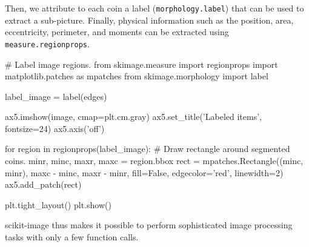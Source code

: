   Then, we attribute to each coin a label (\texttt{morphology.label}) that can be used to extract a sub-picture. Finally, physical information such as the position, area, eccentricity, perimeter, and moments can be extracted using \texttt{measure.regionprops}.

  \begin{pyverbatim}
    # Label image regions.
    from skimage.measure import regionprops
    import matplotlib.patches as mpatches
    from skimage.morphology import label

    label_image = label(edges)

    ax5.imshow(image, cmap=plt.cm.gray)
    ax5.set_title('Labeled items', fontsize=24)
    ax5.axis('off')

    for region in regionprops(label_image):
        # Draw rectangle around segmented coins.
        minr, minc, maxr, maxc = region.bbox
        rect = mpatches.Rectangle((minc, minr),
                                  maxc - minc,
                                  maxr - minr,
                                  fill=False,
                                  edgecolor='red',
                                  linewidth=2)
        ax5.add_patch(rect)

    plt.tight_layout()
    plt.show()
  \end{pyverbatim}

  scikit-image thus makes it possible to perform sophisticated image processing tasks with only a few function calls.
